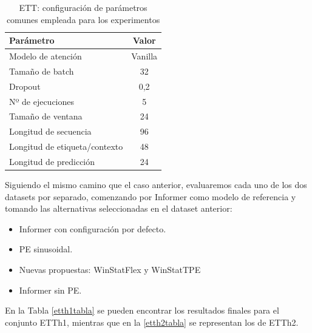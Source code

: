 \begin{table}[!ht]
	\centering
	\begin{tabular}{l|c}
		\toprule
		Parámetro & Valor \\
		\midrule
		{Modelo de atención} & Vanilla \\
		{Tamaño de batch} & 32 \\
		{Dropout} & 0,2 \\
		{Nº de ejecuciones} & 5 \\
		{Tamaño de ventana} & 24 \\
		{Longitud de secuencia} & 96 \\
		{Longitud de etiqueta/contexto} & 48 \\
		{Longitud de predicción} & 24 \\
		\bottomrule
	\end{tabular}
	\caption{ETT: configuración de parámetros comunes empleada para los experimentos}
	\label{ajustesett}
\end{table}

Siguiendo el mismo camino que el caso anterior, evaluaremos cada uno de los dos datasets por separado, comenzando por Informer como modelo de referencia y tomando las alternativas seleccionadas en el dataset anterior:

\begin{itemize}
	\item Informer con configuración por defecto.
	\item PE sinusoidal.
	\item Nuevas propuestas: WinStatFlex y WinStatTPE
	\item Informer sin PE.
\end{itemize}

En la Tabla \ref{etth1tabla} se pueden encontrar los resultados finales para el conjunto ETTh1, mientras que en la \ref{etth2tabla} se representan los de ETTh2.

